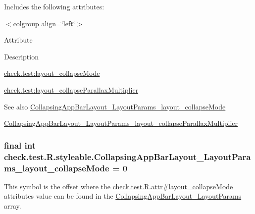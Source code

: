 Includes the following attributes\+:

\begin{TabularC}{0}
\hline
\end{TabularC}
$<$colgroup align=\char`\"{}left\char`\"{}$>$ 

Attribute

Description 

{\ttfamily \hyperlink{classcheck_1_1test_1_1_r_1_1styleable_a577fe4be59c703b28ed8e21615998682}{check.\+test\+:layout\+\_\+collapse\+Mode}}

{\ttfamily \hyperlink{classcheck_1_1test_1_1_r_1_1styleable_ad6ae36504d3df9470ea2d28988011185}{check.\+test\+:layout\+\_\+collapse\+Parallax\+Multiplier}}

\begin{DoxySeeAlso}{See also}
\hyperlink{classcheck_1_1test_1_1_r_1_1styleable_a577fe4be59c703b28ed8e21615998682}{Collapsing\+App\+Bar\+Layout\+\_\+\+Layout\+Params\+\_\+layout\+\_\+collapse\+Mode} 

\hyperlink{classcheck_1_1test_1_1_r_1_1styleable_ad6ae36504d3df9470ea2d28988011185}{Collapsing\+App\+Bar\+Layout\+\_\+\+Layout\+Params\+\_\+layout\+\_\+collapse\+Parallax\+Multiplier} 
\end{DoxySeeAlso}
\hypertarget{classcheck_1_1test_1_1_r_1_1styleable_a577fe4be59c703b28ed8e21615998682}{}
\subsubsection[{Collapsing\+App\+Bar\+Layout\+\_\+\+Layout\+Params\+\_\+layout\+\_\+collapse\+Mode}]{\setlength{\rightskip}{0pt plus 5cm}final int check.\+test.\+R.\+styleable.\+Collapsing\+App\+Bar\+Layout\+\_\+\+Layout\+Params\+\_\+layout\+\_\+collapse\+Mode = 0\hspace{0.3cm}{\ttfamily [static]}}\label{classcheck_1_1test_1_1_r_1_1styleable_a577fe4be59c703b28ed8e21615998682}
This symbol is the offset where the \hyperlink{classcheck_1_1test_1_1_r_1_1attr_a88021fcc3cb9014c95731b525c8c7a13}{check.\+test.\+R.\+attr\#layout\+\_\+collapse\+Mode} attribute\textquotesingle{}s value can be found in the \hyperlink{classcheck_1_1test_1_1_r_1_1styleable_a7e768556a62ed1c95f1a007062d82336}{Collapsing\+App\+Bar\+Layout\+\_\+\+Layout\+Params} array.

